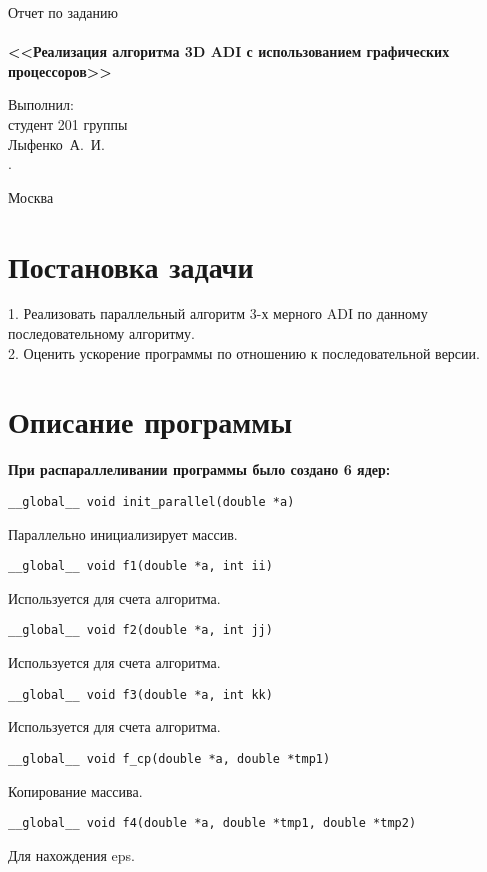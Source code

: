 \documentclass[a4paper,12pt,titlepage,draft]{article}
\begin{document}
\begin{titlepage}
    \begin{center}
	{\Large \sc Отчет по заданию}\\
	~\\
	{\large \bf <<Реализация алгоритма 3D ADI с использованием графических процессоров>>}\\ 
    \end{center}
    \begin{flushright}
	\vfill {Выполнил:\\
	студент 201 группы\\
	Лыфенко~А.~И.\\.}
    \end{flushright}
    \begin{center}
	\vfill
	{\small Москва\\ \the\year{}}
    \end{center}
\end{titlepage}

\section{Постановка задачи}
1. Реализовать параллельный алгоритм 3-х мерного ADI по данному последовательному алгоритму.\\

2. Оценить ускорение программы по отношению к последовательной версии.\\
\newpage
\section{Описание программы}
\textbf{При распараллеливании программы было создано 6 ядер:}\\
\begin{verbatim}
__global__ void init_parallel(double *a)
\end{verbatim}
Параллельно инициализирует массив.\\
\begin{verbatim}
__global__ void f1(double *a, int ii)
\end{verbatim}
Используется для счета алгоритма.
\begin{verbatim}
__global__ void f2(double *a, int jj)
\end{verbatim}
Используется для счета алгоритма.
\begin{verbatim}
__global__ void f3(double *a, int kk)
\end{verbatim}
Используется для счета алгоритма.\\
\begin{verbatim}
__global__ void f_cp(double *a, double *tmp1)
\end{verbatim}
Копирование массива.\\
\begin{verbatim}
__global__ void f4(double *a, double *tmp1, double *tmp2)
\end{verbatim}
Для нахождения eps.\\
\end{document}
